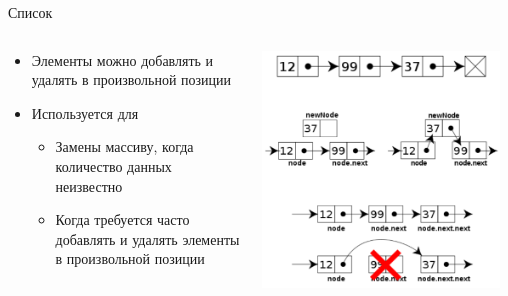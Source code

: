 \documentclass{../../slides-style}
\begin{document}
    
    \begin{frame}[plain]
        \titlepage
    \end{frame}
    
    \begin{frame}{Список}
        \begin{columns}
            \begin{column}{0.55\textwidth}
                \begin{itemize}
                    \item Элементы можно добавлять и удалять в произвольной позиции
                    \item Используется для
                    \begin{itemize}
                        \item Замены массиву, когда количество данных неизвестно
                        \item Когда требуется часто добавлять и удалять элементы в произвольной позиции
                    \end{itemize}
                \end{itemize}
            \end{column}
            \begin{column}{0.45\textwidth}
                \begin{center}
                    \includegraphics[width=0.95\textwidth]{list.png}
                \end{center}
            \end{column}
        \end{columns}
    \end{frame}
\end{document}
